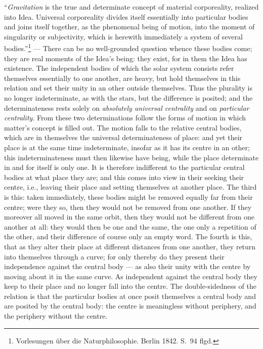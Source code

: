 \documentclass[12pt,a4paper]{book}
\begin{document}
``\emph{Gravitation} is the true and determinate concept of material corporeality, realized into Idea.
Universal corporeality divides itself essentially into particular bodies and joins itself together, as the
phenomenal being of motion, into the moment of singularity or subjectivity, which is herewith immediately a
system of several bodies.''\footnote{%
Vorlesungen über die Naturphilosophie. Berlin 1842. S.\ 94 flgd.} --- There can be no well-grounded question
whence these bodies come; they are real moments of the Idea's being: they exist, for in them the Idea has
existence. The independent bodies of which the solar system consists refer themselves essentially to one
another, are heavy, but hold themselves in this relation and set their unity in an other outside themselves.
Thus the plurality is no longer indeterminate, as with the stars, but the difference is posited; and the
determinateness rests solely on \emph{absolutely universal centrality} and on \emph{particular centrality}.
From these two determinations follow the forms of motion in which matter's concept is filled out. The motion
falls to the relative central bodies, which are in themselves the universal determinateness of place: and
yet their place is at the same time indeterminate, insofar as it has its centre in an other; this
indeterminateness must then likewise have being, while the place determinate in
and for itself is only one. It is therefore indifferent to the particular central bodies at what place they
are; and this comes into view in their seeking their centre, i.e., leaving their place and setting
themselves at another place. The third is this: taken immediately, these bodies might be removed equally far
from their centre; were they so, then they would not be removed from one another. If they moreover all moved
in the same orbit, then they would not be different from one another at all: they would then be one and the
same, the one only a repetition of the other, and their difference of course only an empty word. The fourth
is this, that as they alter their place at different distances from one another, they return into themselves
through a curve; for only thereby do they present their independence against the central body --- as also
their unity with the centre by moving about it in the same curve. As independent against the central body
they keep to their place and no longer fall into the centre. The double-sidedness of the relation is that
the particular bodies at once posit themselves a central body and are posited by the central body: the
centre is meaningless without periphery, and the periphery without the centre.
\end{document}

